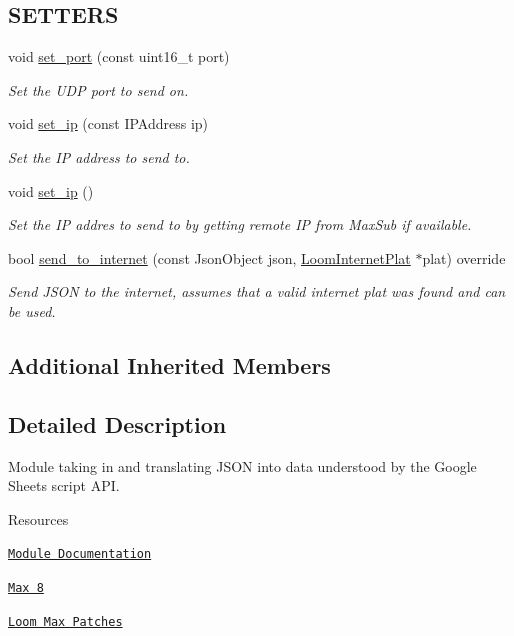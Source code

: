 \subsection*{S\+E\+T\+T\+E\+RS}
\begin{DoxyCompactItemize}
\item 
void \hyperlink{class_loom___max_pub_ab0d598913fba6f06773495806533da81}{set\+\_\+port} (const uint16\+\_\+t port)
\begin{DoxyCompactList}\small\item\em Set the U\+DP port to send on. \end{DoxyCompactList}\item 
void \hyperlink{class_loom___max_pub_a34d82217de5608ee475e73c5d1a13868}{set\+\_\+ip} (const I\+P\+Address ip)
\begin{DoxyCompactList}\small\item\em Set the IP address to send to. \end{DoxyCompactList}\item 
void \hyperlink{class_loom___max_pub_a873dd6ccd99520c4e63207cb371799f4}{set\+\_\+ip} ()
\begin{DoxyCompactList}\small\item\em Set the IP addres to send to by getting remote IP from Max\+Sub if available. \end{DoxyCompactList}\item 
bool \hyperlink{class_loom___max_pub_aa0a82d79ac37d01ba3bb2add3061a235}{send\+\_\+to\+\_\+internet} (const Json\+Object json, \hyperlink{class_loom_internet_plat}{Loom\+Internet\+Plat} $\ast$plat) override
\begin{DoxyCompactList}\small\item\em Send J\+S\+ON to the internet, assumes that a valid internet plat was found and can be used. \end{DoxyCompactList}\end{DoxyCompactItemize}
\subsection*{Additional Inherited Members}


\subsection{Detailed Description}
Module taking in and translating J\+S\+ON into data understood by the Google Sheets script A\+PI. 

\begin{DoxyParagraph}{Resources}

\begin{DoxyItemize}
\item \href{https://openslab-osu.github.io/Loom/html/class_loom___max_pub.html}{\tt Module Documentation}
\item \href{https://cycling74.com}{\tt Max 8}
\item \href{https://github.com/OPEnSLab-OSU/Max-Loom2}{\tt Loom Max Patches} 
\end{DoxyItemize}
\end{DoxyParagraph}


